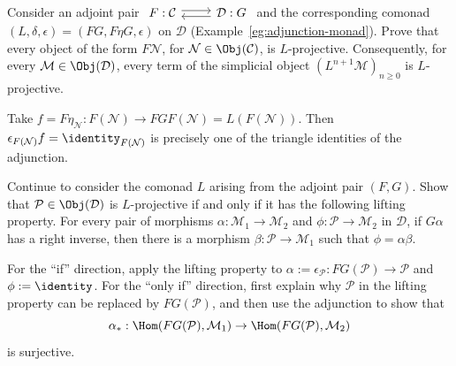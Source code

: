 	\item Consider an adjoint pair
	$\begin{tikzcd}
		F: \mathcal{C} \arrow[shift left, r] & \mathcal{D}: G \arrow[shift left, l]
	\end{tikzcd}$
	and the corresponding comonad
	$(L,\delta,\epsilon)=(FG,F\eta G,\epsilon)$ on
	$\mathcal{D}$ (Example~\ref{eg:adjunction-monad}). Prove that every
	object of the form $F\mathcal{N}$, for
	$\mathcal{N}\in\Obj(\mathcal{C})$, is $L$-projective. Consequently, for
	every $\mathcal{M}\in\Obj(\mathcal{D})$, every term of the simplicial
	object $(L^{n+1}\mathcal{M})_{n\geq0}$ is $L$-projective.

	\begin{hint}
		Take
		$f=F\eta_{\mathcal{N}}:F(\mathcal{N})\to FGF(\mathcal{N})
		=L(F(\mathcal{N}))$. Then
		$\epsilon_{F(\mathcal{N})}f=\identity_{F(\mathcal{N})}$ is precisely
		one of the triangle identities of the adjunction.
	\end{hint}

	\item Continue to consider the comonad $L$ arising from the adjoint pair
	$(F,G)$. Show that $\mathcal{P}\in\Obj(\mathcal{D})$ is $L$-projective
	if and only if it has the following lifting property. For every pair of
	morphisms $\alpha:\mathcal{M}_1\to\mathcal{M}_2$ and
	$\phi:\mathcal{P}\to\mathcal{M}_2$ in $\mathcal{D}$, if $G\alpha$ has
	a right inverse, then there is a morphism
	$\beta:\mathcal{P}\to\mathcal{M}_1$ such that $\phi=\alpha\beta$.

	\begin{hint}
		For the ``if'' direction, apply the lifting property to
		$\alpha:=\epsilon_{\mathcal{P}}:FG(\mathcal{P})\to\mathcal{P}$ and
		$\phi:=\identity$. For the ``only if'' direction, first explain why
		$\mathcal{P}$ in the lifting property can be replaced by
		$FG(\mathcal{P})$, and then use the adjunction to show that
		\[ \alpha_*:\Hom(FG(\mathcal{P}),\mathcal{M}_1)\to
		\Hom(FG(\mathcal{P}),\mathcal{M}_2) \]
		is surjective.
	\end{hint}

